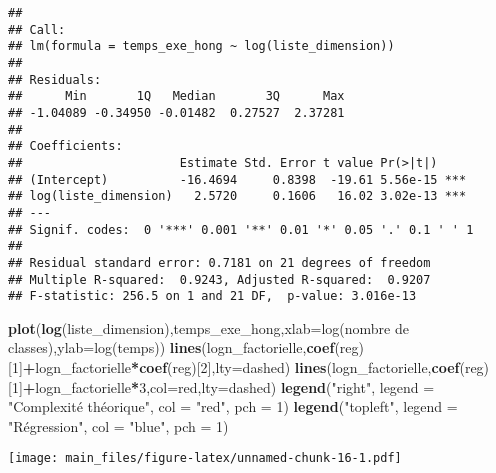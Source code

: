 \documentclass[
]{article}
\newenvironment{Shaded}{\begin{snugshade}}{\end{snugshade}}
\newcommand{\AttributeTok}[1]{\textcolor[rgb]{0.13,0.29,0.53}{#1}}
\newcommand{\DecValTok}[1]{\textcolor[rgb]{0.00,0.00,0.81}{#1}}
\newcommand{\FunctionTok}[1]{\textcolor[rgb]{0.13,0.29,0.53}{\textbf{#1}}}
\newcommand{\NormalTok}[1]{#1}
\newcommand{\SpecialCharTok}[1]{\textcolor[rgb]{0.81,0.36,0.00}{\textbf{#1}}}
\newcommand{\StringTok}[1]{\textcolor[rgb]{0.31,0.60,0.02}{#1}}
\begin{document}
\begin{verbatim}
## 
## Call:
## lm(formula = temps_exe_hong ~ log(liste_dimension))
## 
## Residuals:
##      Min       1Q   Median       3Q      Max 
## -1.04089 -0.34950 -0.01482  0.27527  2.37281 
## 
## Coefficients:
##                      Estimate Std. Error t value Pr(>|t|)    
## (Intercept)          -16.4694     0.8398  -19.61 5.56e-15 ***
## log(liste_dimension)   2.5720     0.1606   16.02 3.02e-13 ***
## ---
## Signif. codes:  0 '***' 0.001 '**' 0.01 '*' 0.05 '.' 0.1 ' ' 1
## 
## Residual standard error: 0.7181 on 21 degrees of freedom
## Multiple R-squared:  0.9243, Adjusted R-squared:  0.9207 
## F-statistic: 256.5 on 1 and 21 DF,  p-value: 3.016e-13
\end{verbatim}

\begin{Shaded}
\begin{Highlighting}[]
\FunctionTok{plot}\NormalTok{(}\FunctionTok{log}\NormalTok{(liste\_dimension),temps\_exe\_hong,}\AttributeTok{xlab=}\StringTok{\textquotesingle{}log(nombre de classes)\textquotesingle{}}\NormalTok{,}\AttributeTok{ylab=}\StringTok{\textquotesingle{}log(temps)\textquotesingle{}}\NormalTok{)}
\FunctionTok{lines}\NormalTok{(logn\_factorielle,}\FunctionTok{coef}\NormalTok{(reg)[}\DecValTok{1}\NormalTok{]}\SpecialCharTok{+}\NormalTok{logn\_factorielle}\SpecialCharTok{*}\FunctionTok{coef}\NormalTok{(reg)[}\DecValTok{2}\NormalTok{],}\AttributeTok{lty=}\StringTok{\textquotesingle{}dashed\textquotesingle{}}\NormalTok{)}
\FunctionTok{lines}\NormalTok{(logn\_factorielle,}\FunctionTok{coef}\NormalTok{(reg)[}\DecValTok{1}\NormalTok{]}\SpecialCharTok{+}\NormalTok{logn\_factorielle}\SpecialCharTok{*}\DecValTok{3}\NormalTok{,}\AttributeTok{col=}\StringTok{\textquotesingle{}red\textquotesingle{}}\NormalTok{,}\AttributeTok{lty=}\StringTok{\textquotesingle{}dashed\textquotesingle{}}\NormalTok{)}
\FunctionTok{legend}\NormalTok{(}\StringTok{"right"}\NormalTok{, }\AttributeTok{legend =} \StringTok{"Complexité théorique"}\NormalTok{, }\AttributeTok{col =} \StringTok{"red"}\NormalTok{, }\AttributeTok{pch =} \DecValTok{1}\NormalTok{)}
\FunctionTok{legend}\NormalTok{(}\StringTok{"topleft"}\NormalTok{, }\AttributeTok{legend =} \StringTok{"Régression"}\NormalTok{, }\AttributeTok{col =} \StringTok{"blue"}\NormalTok{, }\AttributeTok{pch =} \DecValTok{1}\NormalTok{)}
\end{Highlighting}
\end{Shaded}

\texttt{[image: main\_files/figure-latex/unnamed-chunk-16-1.pdf]}
\end{document}
